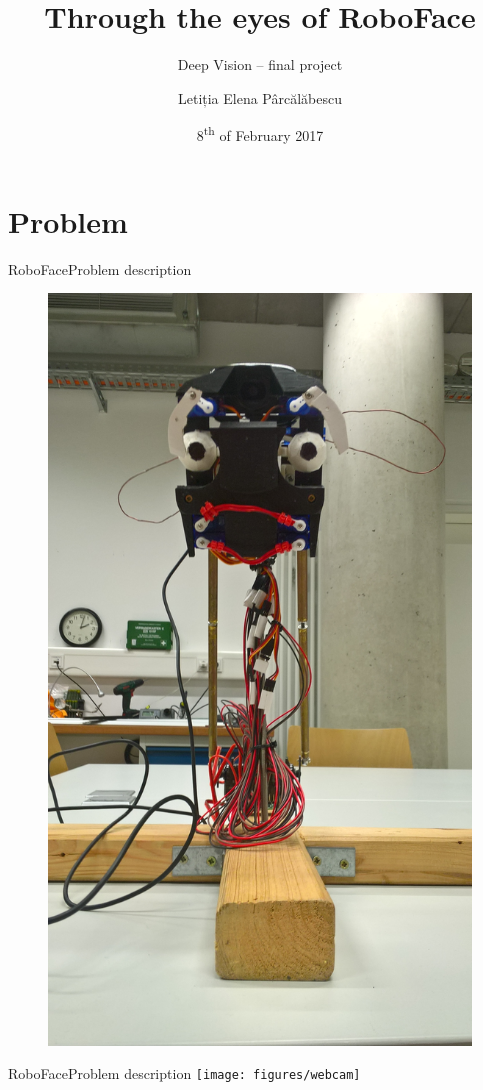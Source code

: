 \documentclass{beamer}
\title[Deep Vision] %
{\textbf{Through the eyes of RoboFace}}
\subtitle{Deep Vision -- final project}
\author{Letiția Elena Pârcălăbescu}
\date{8\textsuperscript{th} of February 2017}
\begin{document}
\frame{\titlepage}


\section{Problem}
\begin{frame}{RoboFace}{Problem description}
	\begin{figure}
		\centering
		\vspace*{-18mm}
		\includegraphics[width=0.8\linewidth,angle=270]{figures/roboFace}
		\label{fig:face}
	\end{figure}
\end{frame}

\begin{frame}{RoboFace}{Problem description}
		\vspace*{-11.6mm}
		\hspace*{2.85cm}
		\texttt{[image: figures/webcam]}
\end{frame}
\end{document}

